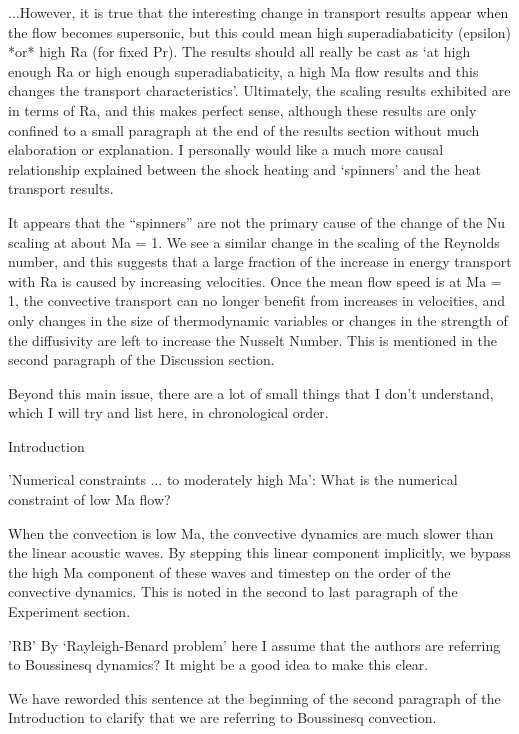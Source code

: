 \documentclass[aps, 11pt, singlecolumn]{revtex4-1} %
\begin{document}
\begin{singlespace}
\begin{myquotation}
...However, it is true that the
interesting change in transport results appear when the flow becomes
supersonic, but this could mean high superadiabaticity (epsilon) *or*
high Ra (for fixed Pr). The results should all really be cast as
`at high enough Ra or high enough superadiabaticity, a high Ma flow
results and this changes the transport characteristics'.
Ultimately, the scaling results exhibited are in terms of Ra, and this
makes perfect sense, although these results are only confined to a
small paragraph at the end of the results section without much
elaboration or explanation. I personally would like a much more causal
relationship explained between the shock heating and `spinners'
and the heat transport results.
\end{myquotation}
It appears that the ``spinners'' are not the primary cause of the change
of the Nu scaling at about Ma = 1.  We see a similar change in the scaling
of the Reynolds number, and this suggests that a large fraction of the
increase in energy transport with Ra is caused by increasing velocities.
Once the mean flow speed is at Ma = 1, the convective transport
can no longer benefit from increases in velocities, and only changes in
the size of thermodynamic variables or changes in the strength of the
diffusivity are left to increase the Nusselt Number.  This is
mentioned in the second paragraph of the Discussion section.

\begin{myquotation}
Beyond this main issue, there are a lot of small things that I don't
understand, which I will try and list here, in chronological order.

Introduction

'Numerical constraints ... to moderately high Ma': What is the
numerical constraint of low Ma flow?
\end{myquotation}
When the convection is low Ma, the convective dynamics are much slower
than the linear acoustic waves.  By stepping this linear component
implicitly, we bypass the high Ma component of these waves and timestep
on the order of the convective dynamics.  This is noted in the second to
last paragraph of the Experiment section.

\begin{myquotation}
'RB' By `Rayleigh-Benard problem' here I assume that the
authors are referring to Boussinesq dynamics? It might be a good idea
to make this clear.
\end{myquotation}
We have reworded this sentence at the beginning of the second paragraph of the
Introduction to clarify that we are referring to Boussinesq convection.


\end{singlespace}
\end{document}
